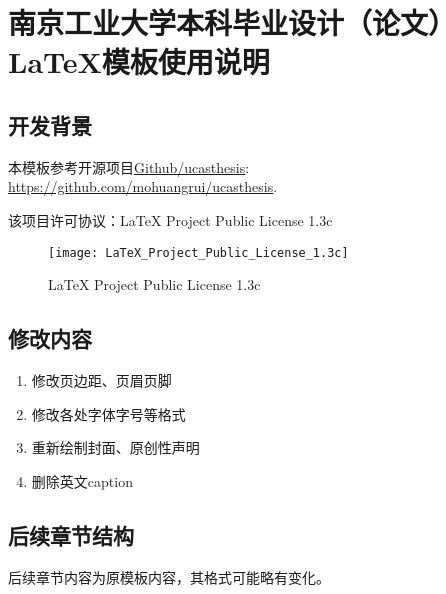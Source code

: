 \chapter[南京工业大学本科毕业设计（论文）\LaTeX{}模板使用说明]{南京工业大学本科毕业设计（论文）\\ \LaTeX{}模板使用说明}%

\section{开发背景}

本模板参考开源项目\href{https://github.com/mohuangrui/ucasthesis}{Github/ucasthesis}: \url{https://github.com/mohuangrui/ucasthesis}.

该项目许可协议：LaTeX Project Public License 1.3c

\begin{figure}[!htbp]
    \centering
    \texttt{[image: LaTeX\_Project\_Public\_License\_1.3c]}
    \caption{LaTeX Project Public License 1.3c}
    \label{fig:LaTeX_Project_Public_License_1.3c}
\end{figure}


\section{修改内容}

\begin{enumerate}
    \item 修改页边距、页眉页脚
    \item 修改各处字体字号等格式
    \item 重新绘制封面、原创性声明
    \item 删除英文caption
\end{enumerate}

\section{后续章节结构}

后续章节内容为原模板内容，其格式可能略有变化。